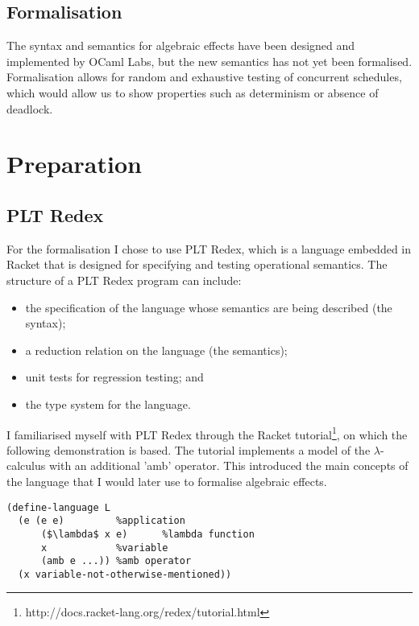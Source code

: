 \documentclass[12pt,a4paper,twoside,openright]{report}
\begin{document}
\section{Formalisation}

The syntax and semantics for algebraic effects have been designed and implemented by OCaml Labs, but the new semantics has not yet been formalised. Formalisation allows for random and exhaustive testing of concurrent schedules, which would allow us to show properties such as determinism or absence of deadlock.

\chapter{Preparation}

\section{PLT Redex}

For the formalisation I chose to use PLT Redex, which is a language embedded in Racket that is designed for specifying and testing operational semantics. The structure of a PLT Redex program can include:

\begin{itemize}
\item the specification of the language whose semantics are being described (the syntax);
\item a reduction relation on the language (the semantics);
\item unit tests for regression testing; and
\item the type system for the language.
\end{itemize}

I familiarised myself with PLT Redex through the Racket tutorial\footnote{http://docs.racket-lang.org/redex/tutorial.html}, on which the following demonstration is based. The tutorial implements a model of the $\lambda$-calculus with an additional 'amb' operator. This introduced the main concepts of the language that I would later use to formalise algebraic effects.

\begin{lstlisting}[caption=Defining a language in PLT Redex,label={lst:redex1}]
(define-language L
  (e (e e)         %application
      ($\lambda$ x e)      %lambda function
      x            %variable
      (amb e ...)) %amb operator
  (x variable-not-otherwise-mentioned))
\end{lstlisting}
\end{document}
